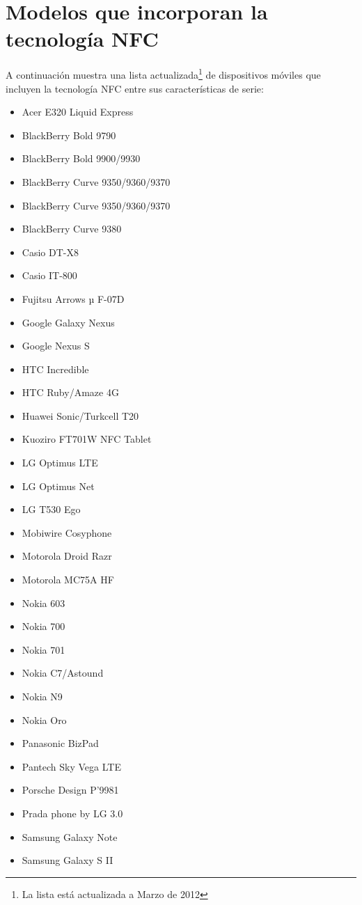 \chapter{Modelos que incorporan la tecnología \acs{NFC}}
\label{chap:nfcMobiles}
A continuación muestra una lista actualizada\footnote{La lista está 
actualizada a Marzo de 2012} de dispositivos móviles que incluyen la 
tecnología \acs{NFC} entre sus características de serie\cite{bib:nfcMobiles}:
\begin{itemize}
\item Acer E320 Liquid Express
\item BlackBerry Bold 9790
\item BlackBerry Bold 9900/9930
\item BlackBerry Curve 9350/9360/9370
\item BlackBerry Curve 9350/9360/9370
\item BlackBerry Curve 9380
\item Casio DT-X8
\item Casio IT-800
\item Fujitsu Arrows µ F-07D
\item Google Galaxy Nexus
\item Google Nexus S
\item HTC Incredible
\item HTC Ruby/Amaze 4G
\item Huawei Sonic/Turkcell T20
\item Kuoziro FT701W NFC Tablet
\item LG Optimus LTE
\item LG Optimus Net
\item LG T530 Ego
\item Mobiwire Cosyphone
\item Motorola Droid Razr
\item Motorola MC75A HF
\item Nokia 603
\item Nokia 700
\item Nokia 701
\item Nokia C7/Astound
\item Nokia N9
\item Nokia Oro
\item Panasonic BizPad
\item Pantech Sky Vega LTE
\item Porsche Design P’9981
\item Prada phone by LG 3.0
\item Samsung Galaxy Note
\item Samsung Galaxy S II

\end{itemize}

